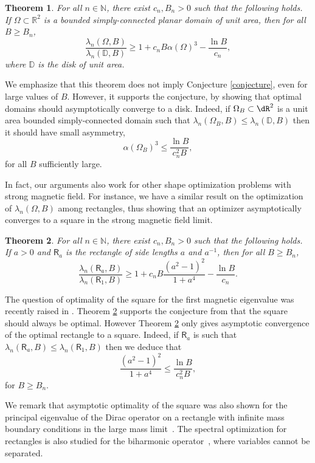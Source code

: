 \documentclass[11pt,a4paper]{amsart}
\numberwithin{figure}{section}
\numberwithin{equation}{section}
\theoremstyle{plain}%
\theoremstyle{remark}
\theoremstyle{plain}
\newtheorem{theorem}{Theorem}
\newcommand{\R}{\mathbb R}
\newcommand{\D}{\mathbb D}
\begin{document}
\begin{theorem}\label{thm.1}
For all $n \in \mathbb N$, there exist $c_n,B_n >0$ such that the following holds. If $\Omega \subset \R^2$ is a bounded simply-connected planar domain of unit area, then for all $B \geq B_n$,
\[ \frac{\lambda_n(\Omega,B)}{\lambda_n(\D,B)} \geq 1 + c_n B \alpha(\Omega)^3 - \frac{\ln B}{c_n},\]
where $\mathbb D$ is the disk of unit area.
\end{theorem}

We emphasize that this theorem does not imply Conjecture \ref{conjecture}, even for large values of $B$. However, it supports the conjecture, by showing that optimal domains should asymptotically converge to a disk. Indeed, if $\Omega_B\subset\dR^2$ is a unit area bounded simply-connected domain such that $\lambda_n(\Omega_B,B) \leq \lambda_n(\D,B)$ then it should have small asymmetry,
\[ \alpha(\Omega_B)^3 \leq \frac{\ln B}{c_n^2 B},\]
for all $B$ sufficiently large.

In fact, our arguments also work for other shape optimization problems with strong magnetic field. For instance, we have a similar result on the optimization of $\lambda_n(\Omega,B)$ among rectangles, thus showing that an optimizer asymptotically converges to a square in the strong magnetic field limit.

\begin{theorem}\label{thm.2}
For all $n \in \mathbb N$, there exist $c_n,B_n>0$ such that the following holds. If $a>0$ and $\mathsf R_a$ is the rectangle of side lengths $a$ and $a^{-1}$, then for all $B \geq B_n$,
\[ \frac{\lambda_n(\mathsf R_a,B)}{\lambda_n(\mathsf R_1,B)} \geq 1 + c_n B \frac{(a^2-1)^2}{1+a^4} - \frac{\ln B}{c_n}. \]
\end{theorem}

The question of optimality of the square for the first magnetic eigenvalue was recently raised in \cite{K25}. Theorem \ref{thm.2} supports the conjecture from \cite{K25} that the square should always be optimal. However Theorem \ref{thm.2} only gives asymptotic convergence of the optimal rectangle to a square. Indeed, if $\mathsf{R}_a$ is such that $\lambda_n(\mathsf R_a,B) \leq \lambda_n(\mathsf R_1,B)$ then we deduce that
\[ \frac{(a^2-1)^2}{1+a^4} \leq \frac{\ln B}{c_n^2 B}, \]
for $B \geq B_n$. 

We remark that asymptotic optimality of the square was also shown for the principal eigenvalue of the Dirac operator on a rectangle with infinite mass boundary conditions in the large mass limit~\cite{BK22}. The spectral optimization for rectangles is also studied for the 
biharmonic operator~\cite{BF20}, where variables cannot be separated.
\end{document}
